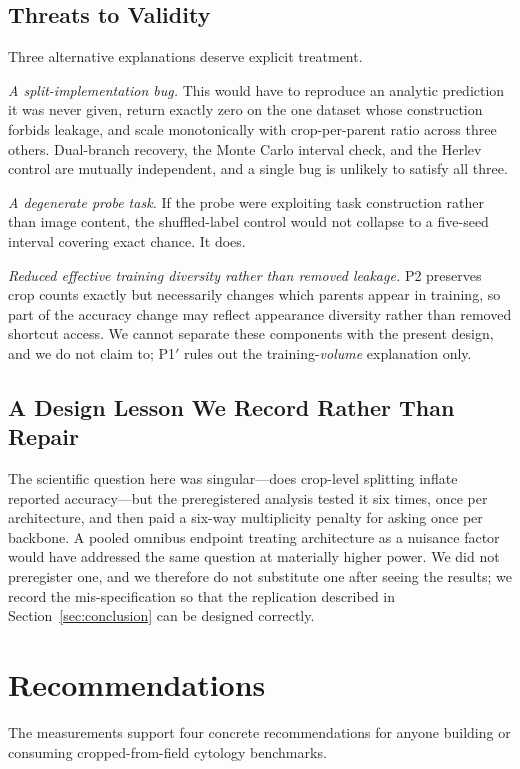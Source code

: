 \documentclass[conference]{IEEEtran}
\newcommand{\protocol}[1]{\textsf{#1}}
\begin{document}
\subsection{Threats to Validity}
Three alternative explanations deserve explicit treatment.

\emph{A split-implementation bug.}
This would have to reproduce an analytic prediction it was never given, return exactly zero on the one dataset whose construction forbids leakage, and scale monotonically with crop-per-parent ratio across three others.
Dual-branch recovery, the Monte Carlo interval check, and the Herlev control are mutually independent, and a single bug is unlikely to satisfy all three.

\emph{A degenerate probe task.}
If the probe were exploiting task construction rather than image content, the shuffled-label control would not collapse to a five-seed interval covering exact chance.
It does.

\emph{Reduced effective training diversity rather than removed leakage.}
\protocol{P2} preserves crop counts exactly but necessarily changes which parents appear in training, so part of the accuracy change may reflect appearance diversity rather than removed shortcut access.
We cannot separate these components with the present design, and we do not claim to; \protocol{P1$'$} rules out the training-\emph{volume} explanation only.

\subsection{A Design Lesson We Record Rather Than Repair}
The scientific question here was singular---does crop-level splitting inflate reported accuracy---but the preregistered analysis tested it six times, once per architecture, and then paid a six-way multiplicity penalty for asking once per backbone.
A pooled omnibus endpoint treating architecture as a nuisance factor would have addressed the same question at materially higher power.
We did not preregister one, and we therefore do not substitute one after seeing the results; we record the mis-specification so that the replication described in Section~\ref{sec:conclusion} can be designed correctly.

\section{Recommendations}
The measurements support four concrete recommendations for anyone building or consuming cropped-from-field cytology benchmarks.
\end{document}
